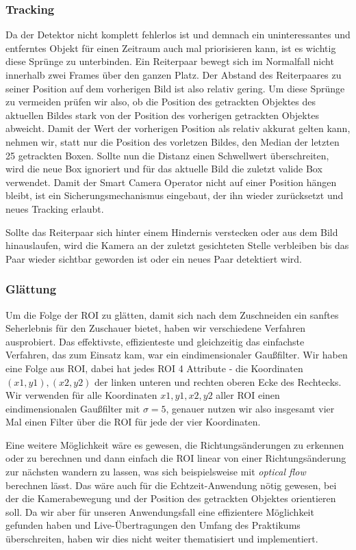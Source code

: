 \subsubsection*{Tracking}
Da der Detektor nicht komplett fehlerlos ist und demnach ein uninteressantes und entferntes Objekt für einen Zeitraum auch mal priorisieren kann, ist es wichtig diese Sprünge zu unterbinden. Ein Reiterpaar bewegt sich im Normalfall nicht innerhalb zwei Frames über den ganzen Platz. Der Abstand des Reiterpaares zu seiner Position auf dem vorherigen Bild ist also relativ gering. Um diese Sprünge zu vermeiden prüfen wir also, ob die Position des getrackten Objektes des aktuellen Bildes stark von der Position des vorherigen getrackten Objektes abweicht. Damit der Wert der vorherigen Position als relativ akkurat gelten kann, nehmen wir, statt nur die Position des vorletzen Bildes, den Median der letzten 25 getrackten Boxen. Sollte nun die Distanz einen Schwellwert überschreiten, wird die neue Box ignoriert und für das aktuelle Bild die zuletzt valide Box verwendet. Damit der Smart Camera Operator nicht auf einer Position hängen bleibt, ist ein Sicherungsmechanismus eingebaut, der ihn wieder zurücksetzt und neues Tracking erlaubt.

Sollte das Reiterpaar sich hinter einem Hindernis verstecken oder aus dem Bild hinauslaufen, wird die Kamera an der zuletzt gesichteten Stelle verbleiben bis das Paar wieder sichtbar geworden ist oder ein neues Paar detektiert wird.

\subsubsection*{Glättung}
Um die Folge der ROI zu glätten, damit sich nach dem Zuschneiden ein sanftes Seherlebnis für den Zuschauer bietet, haben wir verschiedene Verfahren ausprobiert.
Das effektivste, effizienteste und gleichzeitig das einfachste Verfahren, das zum Einsatz kam, war ein eindimensionaler Gaußfilter.
Wir haben eine Folge aus ROI, dabei hat jedes ROI 4 Attribute - die Koordinaten $(x1,y1), (x2,y2)$ der linken unteren und rechten oberen Ecke des Rechtecks.
Wir verwenden für alle Koordinaten $x1, y1, x2, y2$ aller ROI einen eindimensionalen Gaußfilter mit $\sigma=5$, genauer nutzen wir also insgesamt vier Mal einen Filter über die ROI für jede der vier Koordinaten.

Eine weitere Möglichkeit wäre es gewesen, die Richtungsänderungen zu erkennen oder zu berechnen und dann einfach die ROI linear von einer Richtungsänderung zur nächsten wandern zu lassen, was sich beispielsweise mit \emph{optical flow} berechnen lässt. Das wäre auch für die Echtzeit-Anwendung nötig gewesen, bei der die Kamerabewegung und der Position des getrackten Objektes orientieren soll.
Da wir aber für unseren Anwendungsfall eine effizientere Möglichkeit gefunden haben und Live-Übertragungen den Umfang des Praktikums überschreiten, haben wir dies nicht weiter thematisiert und implementiert. 
